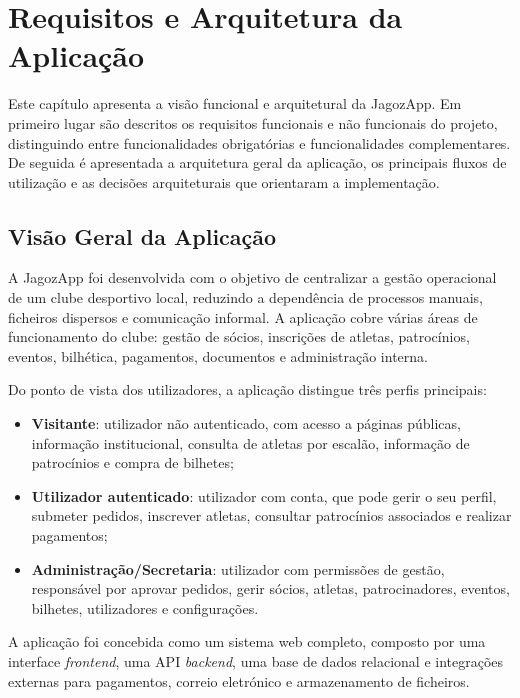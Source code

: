 \chapter{Requisitos e Arquitetura da Aplicação}
\label{chap:requisitos-arquitetura}

Este capítulo apresenta a visão funcional e arquitetural da JagozApp. Em
primeiro lugar são descritos os requisitos funcionais e não funcionais do
projeto, distinguindo entre funcionalidades obrigatórias e funcionalidades
complementares. De seguida é apresentada a arquitetura geral da aplicação, os
principais fluxos de utilização e as decisões arquiteturais que orientaram a
implementação.

\section{Visão Geral da Aplicação}

A JagozApp foi desenvolvida com o objetivo de centralizar a gestão operacional
de um clube desportivo local, reduzindo a dependência de processos manuais,
ficheiros dispersos e comunicação informal. A aplicação cobre várias áreas de
funcionamento do clube: gestão de sócios, inscrições de atletas, patrocínios,
eventos, bilhética, pagamentos, documentos e administração interna.

Do ponto de vista dos utilizadores, a aplicação distingue três perfis principais:

\begin{itemize}
    \item \textbf{Visitante}: utilizador não autenticado, com acesso a páginas
    públicas, informação institucional, consulta de atletas por escalão,
    informação de patrocínios e compra de bilhetes;
    \item \textbf{Utilizador autenticado}: utilizador com conta, que pode gerir
    o seu perfil, submeter pedidos, inscrever atletas, consultar patrocínios
    associados e realizar pagamentos;
    \item \textbf{Administração/Secretaria}: utilizador com permissões de
    gestão, responsável por aprovar pedidos, gerir sócios, atletas,
    patrocinadores, eventos, bilhetes, utilizadores e configurações.
\end{itemize}

A aplicação foi concebida como um sistema web completo, composto por uma
interface \textit{frontend}, uma API \textit{backend}, uma base de dados
relacional e integrações externas para pagamentos, correio eletrónico e
armazenamento de ficheiros.

